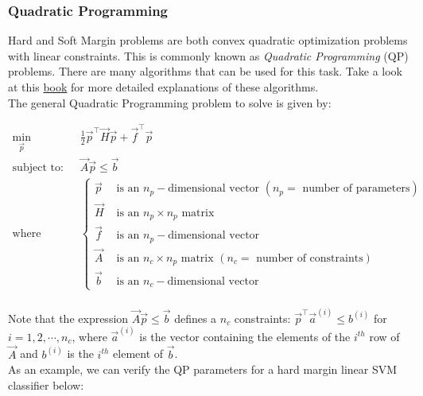 \subsubsection*{Quadratic Programming}

Hard and Soft Margin problems are both convex quadratic optimization problems with linear constraints. This is 
commonly known as \textit{Quadratic Programming} (QP) problems. There are many algorithms that can be used
for this task. Take a look at this \href{https://web.stanford.edu/~boyd/cvxbook/bv_cvxbook.pdf}{book} for more 
detailed explanations of these algorithms. \\

\noindent
The general Quadratic Programming problem to solve is given by:

\[
\begin{aligned}
\min_{\vec{p}} \quad & \frac{1}{2}\vec{p}^{\intercal}\vec{H}\vec{p} + \vec{f}^{\intercal}\vec{p}\\
\textrm{subject to:} \quad & \vec{A}\vec{p} \leq \vec{b} \\
\textrm{where} \quad & 
\begin{cases} 
    \vec{p} & \textrm{ is an } n_{p}-\textrm{dimensional vector } (n_{p} = \textrm{ number of parameters}) \\
    \vec{H} & \textrm{ is an } n_{p} \times n_{p} \textrm{ matrix} \\
    \vec{f} & \textrm{ is an } n_{p}-\textrm{dimensional vector} \\
    \vec{A} & \textrm{ is an } n_{c} \times n_{p} \textrm{ matrix } (n_{c} = \textrm{ number of constraints})\\
    \vec{b} & \textrm{ is an } n_{c}-\textrm{dimensional vector}
\end{cases}
\end{aligned}
\] \\

\noindent 
Note that the expression $\vec{A}\vec{p} \leq \vec{b}$ defines a $n_{c}$ constraints: $\vec{p}^{\intercal}\vec{a}^{(i)} \leq b^{(i)}$
for $i = 1, 2, \cdots, n_{c}$, where $\vec{a}^{(i)}$ is the vector containing the elements of the $i^{th}$ row
of $\vec{A}$ and $b^{(i)}$ is the $i^{th}$ element of $\vec{b}$.\\

\noindent 
As an example, we can verify the QP parameters for a hard margin linear SVM classifier below:

